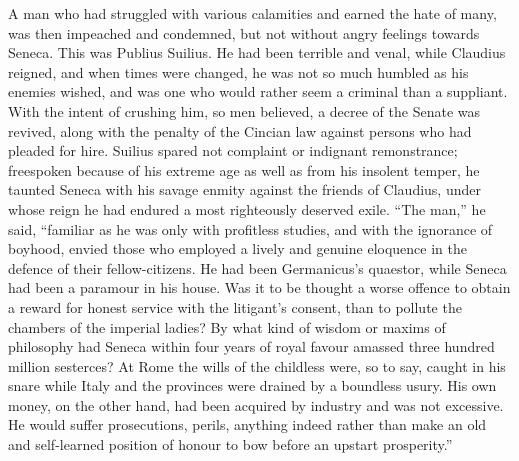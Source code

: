 A man who had struggled with various calamities and earned the hate of many, was then impeached and condemned, but not without angry feelings towards Seneca. This was Publius Suilius. He had been terrible and venal, while Claudius reigned, and when times were changed, he was not so much humbled as his enemies wished, and was one who would rather seem a criminal than a suppliant. With the intent of crushing him, so men believed, a decree of the Senate was revived, along with the penalty of the Cincian law against persons who had pleaded for hire. Suilius spared not complaint or indignant remonstrance; freespoken because of his extreme age as well as from his insolent temper, he taunted Seneca with his savage enmity against the friends of Claudius, under whose reign he had endured a most righteously deserved exile. ``The man,'' he said, ``familiar as he was only with profitless studies, and with the ignorance of boyhood, envied those who employed a lively and genuine eloquence in the defence of their fellow-citizens. He had been Germanicus's quaestor, while Seneca had been a paramour in his house. Was it to be thought a worse offence to obtain a reward for honest service with the litigant's consent, than to pollute the chambers of the imperial ladies? By what kind of wisdom or maxims of philosophy had Seneca within four years of royal favour amassed three hundred million sesterces? At Rome the wills of the childless were, so to say, caught in his snare while Italy and the provinces were drained by a boundless usury. His own money, on the other hand, had been acquired by industry and was not excessive. He would suffer prosecutions, perils, anything indeed rather than make an old and self-learned position of honour to bow before an upstart prosperity.''


